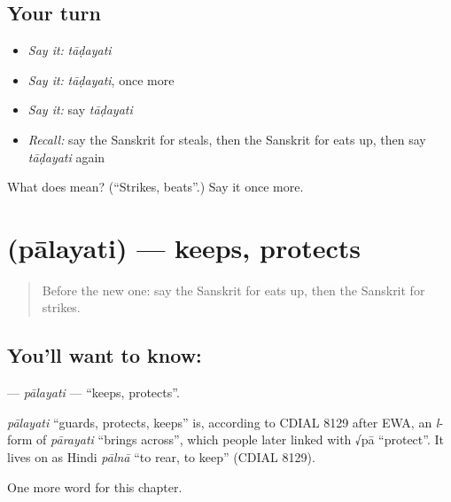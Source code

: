 \subsection*{Your turn}
\begin{itemize}
\raggedright
  \item \emph{Say it:} \emph{tāḍayati}
  \item \emph{Say it:} \emph{tāḍayati}, once more
  \item \emph{Say it:} say \emph{tāḍayati}
  \item \emph{Recall:} say the Sanskrit for steals, then the Sanskrit for eats up, then say \emph{tāḍayati} again
\end{itemize}

\begin{tcolorbox}[breakable,colback=teal!4,colframe=teal!35!black,title={Before you move on}]
What does  mean? (\textquotedblleft{}Strikes, beats\textquotedblright{}.) Say it once more.
\end{tcolorbox}
\section[\texorpdfstring{\sk{पालयति} (pālayati)}{पालयति (pālayati)}]{ (pālayati) — keeps, protects}

\label{lesson:SA-C174-palayati}



\begin{quote}
Before the new one: say the Sanskrit for eats up, then the Sanskrit for strikes.
\end{quote}

\subsection*{You'll want to know: }
\textbf{} — \emph{pālayati} — \textquotedblleft{}keeps, protects\textquotedblright{}.

\begin{cousinweb}
\emph{pālayati} \textquotedblleft{}guards, protects, keeps\textquotedblright{} is, according to CDIAL 8129 after EWA, an \emph{l}-form of \emph{pārayati} \textquotedblleft{}brings across\textquotedblright{}, which people later linked with √pā \textquotedblleft{}protect\textquotedblright{}. It lives on as Hindi \emph{pālnā} \textquotedblleft{}to rear, to keep\textquotedblright{} (CDIAL 8129).
\end{cousinweb}

\begin{grammarlens}[title={What you've built}]
One more word for this chapter.
\end{grammarlens}

